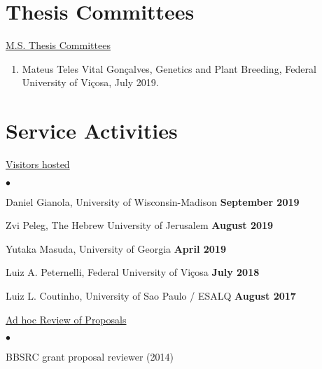 \documentclass[margin,line,10pt]{res}
\newenvironment{list2}{
  \begin{list}{$\bullet$}{%
      \setlength{\itemsep}{0in}
      \setlength{\parsep}{0in} \setlength{\parskip}{0in}
      \setlength{\topsep}{0in} \setlength{\partopsep}{0in} 
      \setlength{\leftmargin}{0.2in}}}{\end{list}}
\begin{document}
\begin{resume}
\vspace{0.5cm}
\section{\sc Thesis Committees}

\begin{flushleft}
\hspace{0.2cm} \underline{M.S. Thesis Committees}
\end{flushleft}
\begin{enumerate}
\item Mateus Teles Vital Gon\c calves, Genetics and Plant Breeding, Federal University of Vi\c cosa, July 2019.
\end{enumerate}




\vspace{0.5cm}
\section{\sc Service Activities}

\begin{flushleft}
\hspace{0.2cm} \underline{Visitors hosted}
\end{flushleft}
\begin{list2}
\item Daniel Gianola, University of Wisconsin-Madison  \hfill \textbf{September 2019}\\

\item Zvi Peleg, The Hebrew University of Jerusalem   \hfill \textbf{August 2019}\\

\item Yutaka Masuda, University of Georgia \hfill \textbf{April 2019}\\


\item Luiz A. Peternelli, Federal University of Vi\c cosa  \hfill \textbf{July 2018}\\

    
\item Luiz L. Coutinho, University of Sao Paulo / ESALQ  \hfill \textbf{August 2017}\\


\end{list2}



\begin{flushleft}
\hspace{0.3cm} \underline{Ad hoc Review of Proposals}
\end{flushleft}
\begin{list2}
\item BBSRC grant proposal reviewer (2014)
\end{list2}


\end{resume}
\end{document}
